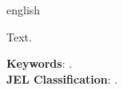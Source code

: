 

\begin{resumo}[Abstract]
	\begin{otherlanguage*}{english}
		\SingleSpacing
		
		Text.
		
		\noindent 
		\textbf{Keywords}: . \\
		\textbf{JEL Classification}: .
	\end{otherlanguage*}
\end{resumo}


